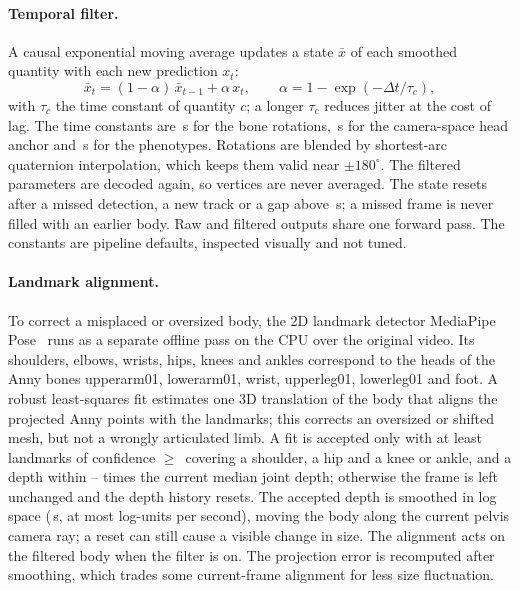 \paragraph{Temporal filter.} A causal exponential moving average updates a state $\bar x$ of each smoothed quantity
with each new prediction $x_t$:
\begin{equation*}
 \bar x_t=(1-\alpha)\,\bar x_{t-1}+\alpha\,x_t,\qquad \alpha=1-\exp(-\Delta t/\tau_c),
\end{equation*}
with $\tau_c$ the time constant of quantity $c$; a longer $\tau_c$ reduces jitter at the cost of lag. The time
constants are \VideoPoseTau\,s for the bone rotations,
\VideoTranslTau\,s for the camera-space head anchor and \VideoShapeTau\,s for the phenotypes. Rotations are blended by
shortest-arc quaternion interpolation, which keeps them valid near $\pm180^\circ$. The filtered parameters are decoded again, so vertices are never averaged.
The state resets after a missed detection, a new track or a gap above \VideoMaxGap\,s; a missed frame is never filled
with an earlier body. Raw and filtered outputs share one forward pass. The constants are pipeline defaults, inspected visually and not tuned.

\paragraph{Landmark alignment.} To correct a misplaced or oversized body, the 2D landmark detector MediaPipe Pose~\cite{mediapipecode} runs as a separate offline pass on the CPU over the original video. Its shoulders, elbows, wrists, hips, knees and ankles correspond to the heads of the Anny bones
upperarm01, lowerarm01, wrist, upperleg01, lowerleg01 and foot. A robust least-squares fit estimates one 3D translation of
the body that aligns the projected Anny points with the landmarks; this corrects an oversized or shifted mesh, but not a
wrongly articulated limb. A fit is accepted only with at least
\VideoMinLandmarks{} landmarks of confidence $\ge$\,\VideoMinConf{} covering a shoulder, a hip and a knee or ankle, and
a depth within \VideoDepthBoundLow--\VideoDepthBoundHigh{} times the current median joint depth; otherwise the frame is
left unchanged and the depth history resets. The accepted depth is smoothed in log space (\VideoDepthTau\,s, at most
\VideoDepthRate{} log-units per second), moving the body along the current pelvis camera ray; a reset can still cause a
visible change in size. The alignment acts on the filtered body when the filter is on. The projection error is recomputed after smoothing,
which trades some current-frame alignment for less size fluctuation.

